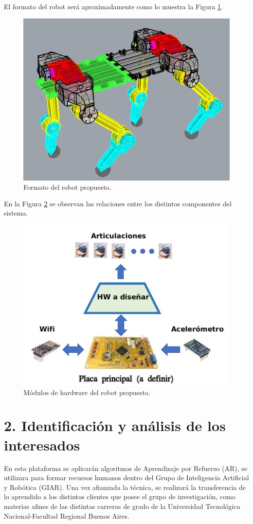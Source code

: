 \documentclass[
11pt, %
codirector, %
]{charter}
\begin{document}
El formato del robot será aproximadamente como lo muestra la Figura \ref{fig:robotTetrapodo}.
\begin{figure}[htpb]
\centering 
\includegraphics[width=.55\textwidth]{./Figuras/tetratopo.png}
\caption{Formato del robot propuesto.}
\label{fig:robotTetrapodo}
\end{figure}

En la Figura \ref{fig:robotDiagrama} se observan las relaciones entre los distintos componentes del sistema.

\begin{figure}[htpb]
\centering 
\includegraphics[width=.8\textwidth]{./Figuras/tetra.png}
\caption{Módulos de hardware del robot propuesto.}
\label{fig:robotDiagrama}
\end{figure}


\section{2. Identificación y análisis de los interesados}
\label{sec:interesados}

En esta plataforma se aplicarán algoritmos de Aprendizaje por Refuerzo (AR), se utilizara para formar recursos humanos dentro del Grupo de Inteligencia Artificial y Robótica (GIAR). Una vez afianzada la técnica, se realizará la transferencia de lo aprendido a los distintos clientes que posee el grupo de investigación, como materias afines de las distintas carreras de grado de la Universidad Tecnológica Nacional-Facultad Regional Buenos Aires.
\end{document}
